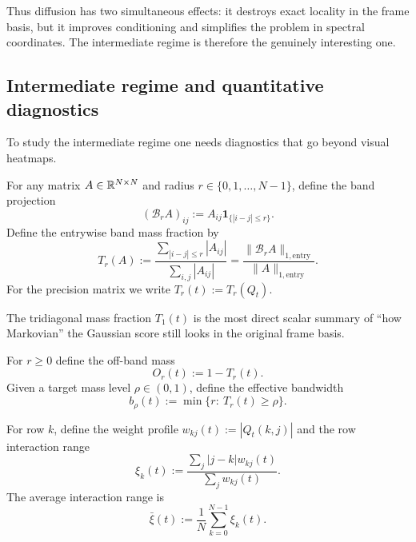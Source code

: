 \documentclass[11pt]{article}
\begin{document}
Thus diffusion has two simultaneous effects: it destroys exact locality in the frame basis, but it improves conditioning and simplifies the problem in spectral coordinates. The intermediate regime is therefore the genuinely interesting one.

\subsection{Intermediate regime and quantitative diagnostics}

To study the intermediate regime one needs diagnostics that go beyond visual heatmaps.

\begin{definition}
For any matrix $A\in\mathbb{R}^{N\times N}$ and radius $r\in\{0,1,\dots,N-1\}$, define the band projection
\begin{equation}
 (\mathcal B_rA)_{ij}:=A_{ij}\mathbf 1_{\{|i-j|\leq r\}}.
\end{equation}
Define the entrywise band mass fraction by
\begin{equation}
 T_r(A):=\frac{\sum_{|i-j|\leq r}|A_{ij}|}{\sum_{i,j}|A_{ij}|}
 =\frac{\|\mathcal B_rA\|_{1,\mathrm{entry}}}{\|A\|_{1,\mathrm{entry}}}.
\end{equation}
For the precision matrix we write $T_r(t):=T_r(Q_t)$.
\end{definition}

The tridiagonal mass fraction $T_1(t)$ is the most direct scalar summary of ``how Markovian'' the Gaussian score still looks in the original frame basis.

\begin{definition}
For $r\geq 0$ define the off-band mass
\begin{equation}
 O_r(t):=1-T_r(t).
\end{equation}
Given a target mass level $\rho\in(0,1)$, define the effective bandwidth
\begin{equation}
 b_\rho(t):=\min\{r:\ T_r(t)\geq \rho\}.
\end{equation}
\end{definition}

\begin{definition}
For row $k$, define the weight profile $w_{kj}(t):=|Q_t(k,j)|$ and the row interaction range
\begin{equation}
 \xi_k(t):=\frac{\sum_j |j-k|w_{kj}(t)}{\sum_j w_{kj}(t)}.
\end{equation}
The average interaction range is
\begin{equation}
 \bar\xi(t):=\frac{1}{N}\sum_{k=0}^{N-1}\xi_k(t).
\end{equation}
\end{definition}
\end{document}
